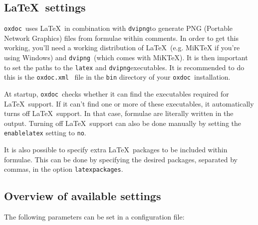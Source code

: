\documentclass[11pt]{article}
\newcommand\oxdoc{{\tt oxdoc}}
\newcommand\oxdocxml{{\tt oxdoc.xml}}
\newcommand\dvipng{{\tt dvipng}}
\begin{document}
\subsection{\LaTeX~settings}
\oxdoc~uses \LaTeX~in combination with \dvipng to generate PNG
(Portable Network Graphics) files from formulae within comments. In order to get this
working, you'll need a working distribution of \LaTeX~(e.g. MiKTeX
if you're using Windows) and \dvipng~(which comes with MiKTeX). It is then important
to set the paths to the {\tt latex} and \dvipng executables. It is recommended to do this is the \oxdocxml~
file in the {\tt bin} directory of your \oxdoc~installation.

At startup, \oxdoc~checks whether it can find the executables required for \LaTeX~support. If
it can't find one or more of these executables, it automatically turns off \LaTeX~support. In that case,
formulae are literally written in the output. Turning off \LaTeX~support can also be done manually by
setting the {\tt enablelatex} setting to {\tt no}.

It is also possible to specify extra \LaTeX~packages to be included within formulae. This can be done
by specifying the desired packages, separated by commas, in the option {\tt latexpackages}.



\subsection{Overview of available settings}
The following parameters can be set in a configuration file:\medskip
\end{document}
